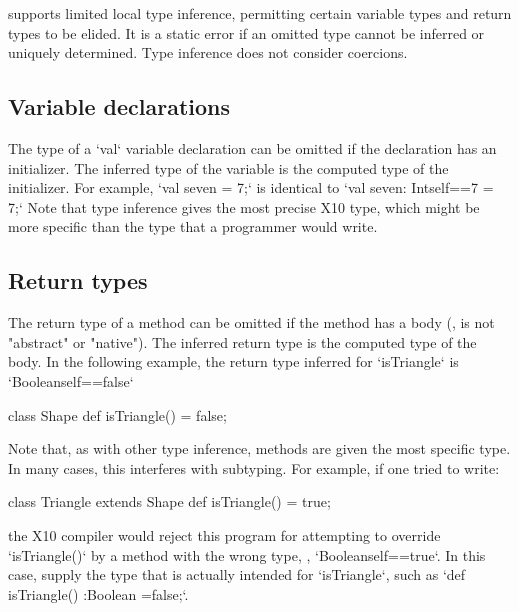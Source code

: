 {\XtenCurrVer{} supports limited local type inference, permitting
certain variable types and return types to be elided.
It is a static error if an omitted type cannot be inferred or
uniquely determined. Type inference does not consider coercions.

\subsection{Variable declarations}

The type of a \xcd`val` variable declaration can be omitted if the
declaration has an initializer.  The inferred type of the
variable is the computed type of the initializer.
For example, 
\xcd`val seven = 7;`
is identical to 
\xcd`val seven: Int{self==7} = 7;`
Note that type inference gives the most precise X10 type, which might be more
specific than the type that a programmer would write.




\subsection{Return types}

The return type of a method can be omitted if the method has a body (\ie, is
not \xcd"abstract" or \xcd"native"). The inferred return type is the computed
type of the body.  In the following example, the return type inferred for
\xcd`isTriangle` is 
\xcd`Boolean{self==false}`
\begin{xten}
class Shape {
  def isTriangle() = false; 
}  
\end{xten}
%
Note that, as with other type inference, methods are given the most specific
type.  In many cases, this interferes with subtyping.  For example, if one
tried to write: 
\begin{xten}
class Triangle extends Shape {
  def isTriangle() = true;
}
\end{xten}
\noindent
the X10 compiler would reject this program for attempting to override
\xcd`isTriangle()` by a method with the wrong type, \viz,
\xcd`Boolean{self==true}`.  In this case, supply the type that is actually
intended for \xcd`isTriangle`, such as 
\xcd`def isTriangle() :Boolean =false;`. 

}
